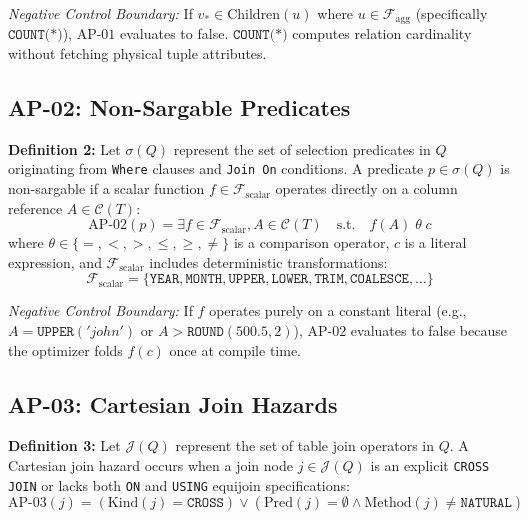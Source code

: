 \documentclass[conference]{IEEEtran}
\begin{document}
\textit{Negative Control Boundary:} If $v_* \in \text{Children}(u)$ where $u \in \mathcal{F}_{\text{agg}}$ (specifically $\texttt{COUNT(*)}$), $\text{AP-01}$ evaluates to false. $\texttt{COUNT(*)}$ computes relation cardinality without fetching physical tuple attributes.

\subsection{AP-02: Non-Sargable Predicates}
\textbf{Definition 2:} Let $\sigma(Q)$ represent the set of selection predicates in $Q$ originating from \texttt{Where} clauses and \texttt{Join On} conditions. A predicate $p \in \sigma(Q)$ is non-sargable if a scalar function $f \in \mathcal{F}_{\text{scalar}}$ operates directly on a column reference $A \in \mathcal{C}(T)$:
\begin{equation}
    \text{AP-02}(p) = \exists f \in \mathcal{F}_{\text{scalar}}, A \in \mathcal{C}(T) \quad \text{s.t.} \quad f(A) \;\theta\; c
\end{equation}
where $\theta \in \{=, <, >, \le, \ge, \ne\}$ is a comparison operator, $c$ is a literal expression, and $\mathcal{F}_{\text{scalar}}$ includes deterministic transformations:
\begin{equation*}
    \mathcal{F}_{\text{scalar}} = \{\texttt{YEAR}, \texttt{MONTH}, \texttt{UPPER}, \texttt{LOWER}, \texttt{TRIM}, \texttt{COALESCE}, \dots\}
\end{equation*}

\textit{Negative Control Boundary:} If $f$ operates purely on a constant literal (e.g., $A = \texttt{UPPER}('john')$ or $A > \texttt{ROUND}(500.5, 2)$), $\text{AP-02}$ evaluates to false because the optimizer folds $f(c)$ once at compile time.

\subsection{AP-03: Cartesian Join Hazards}
\textbf{Definition 3:} Let $\mathcal{J}(Q)$ represent the set of table join operators in $Q$. A Cartesian join hazard occurs when a join node $j \in \mathcal{J}(Q)$ is an explicit \texttt{CROSS JOIN} or lacks both \texttt{ON} and \texttt{USING} equijoin specifications:
\begin{equation}
    \text{AP-03}(j) = (\text{Kind}(j) = \texttt{CROSS}) \lor (\text{Pred}(j) = \emptyset \land \text{Method}(j) \ne \texttt{NATURAL})
\end{equation}
\end{document}
